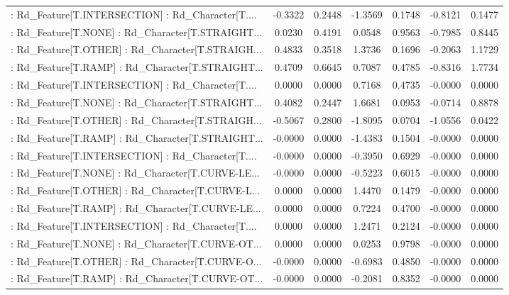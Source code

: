 \begin{longtable}{p{4cm}cccccc}
 : Rd\_Feature[T.INTERSECTION] : Rd\_Character[T.... & -0.3322 &    0.2448 & -1.3569 &       0.1748 & -0.8121 &  0.1477 \\
 : Rd\_Feature[T.NONE] : Rd\_Character[T.STRAIGHT... &  0.0230 &    0.4191 &  0.0548 &       0.9563 & -0.7985 &  0.8445 \\
 : Rd\_Feature[T.OTHER] : Rd\_Character[T.STRAIGH... &  0.4833 &    0.3518 &  1.3736 &       0.1696 & -0.2063 &  1.1729 \\
 : Rd\_Feature[T.RAMP] : Rd\_Character[T.STRAIGHT... &  0.4709 &    0.6645 &  0.7087 &       0.4785 & -0.8316 &  1.7734 \\
 : Rd\_Feature[T.INTERSECTION] : Rd\_Character[T.... &  0.0000 &    0.0000 &  0.7168 &       0.4735 & -0.0000 &  0.0000 \\
 : Rd\_Feature[T.NONE] : Rd\_Character[T.STRAIGHT... &  0.4082 &    0.2447 &  1.6681 &       0.0953 & -0.0714 &  0.8878 \\
 : Rd\_Feature[T.OTHER] : Rd\_Character[T.STRAIGH... & -0.5067 &    0.2800 & -1.8095 &       0.0704 & -1.0556 &  0.0422 \\
 : Rd\_Feature[T.RAMP] : Rd\_Character[T.STRAIGHT... & -0.0000 &    0.0000 & -1.4383 &       0.1504 & -0.0000 &  0.0000 \\
 : Rd\_Feature[T.INTERSECTION] : Rd\_Character[T.... & -0.0000 &    0.0000 & -0.3950 &       0.6929 & -0.0000 &  0.0000 \\
 : Rd\_Feature[T.NONE] : Rd\_Character[T.CURVE-LE... & -0.0000 &    0.0000 & -0.5223 &       0.6015 & -0.0000 &  0.0000 \\
 : Rd\_Feature[T.OTHER] : Rd\_Character[T.CURVE-L... &  0.0000 &    0.0000 &  1.4470 &       0.1479 & -0.0000 &  0.0000 \\
 : Rd\_Feature[T.RAMP] : Rd\_Character[T.CURVE-LE... &  0.0000 &    0.0000 &  0.7224 &       0.4700 & -0.0000 &  0.0000 \\
 : Rd\_Feature[T.INTERSECTION] : Rd\_Character[T.... &  0.0000 &    0.0000 &  1.2471 &       0.2124 & -0.0000 &  0.0000 \\
 : Rd\_Feature[T.NONE] : Rd\_Character[T.CURVE-OT... &  0.0000 &    0.0000 &  0.0253 &       0.9798 & -0.0000 &  0.0000 \\
 : Rd\_Feature[T.OTHER] : Rd\_Character[T.CURVE-O... & -0.0000 &    0.0000 & -0.6983 &       0.4850 & -0.0000 &  0.0000 \\
 : Rd\_Feature[T.RAMP] : Rd\_Character[T.CURVE-OT... & -0.0000 &    0.0000 & -0.2081 &       0.8352 & -0.0000 &  0.0000 \\

\end{longtable}
